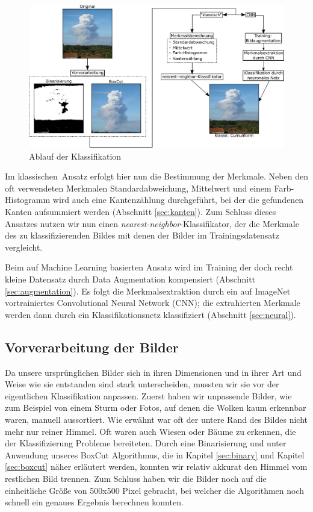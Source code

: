 \documentclass[a4,german]{article}
\begin{document}
\begin{figure}
	\centering
	\includegraphics[height=0.25\paperheight]{Ablauf.pdf}
	\caption{Ablauf der Klassifikation}
	\label{fig:ablauf}
\end{figure}

Im \glqq klassischen\grqq\ Ansatz erfolgt hier nun die Bestimmung der Merkmale.
Neben den oft verwendeten Merkmalen Standardabweichung, Mittelwert und einem Farb-Histogramm wird auch eine Kantenzählung durchgeführt, bei der die gefundenen Kanten aufsummiert werden (Abschnitt \ref{sec:kanten}).
Zum Schluss dieses Ansatzes nutzen wir nun einen \emph{nearest-neighbor}-Klassifikator, der die Merkmale des zu klassifizierenden Bildes mit denen der Bilder im Trainingsdatensatz vergleicht.

Beim auf Machine Learning basierten Ansatz wird im Training der doch recht kleine Datensatz durch Data Augmentation kompensiert (Abschnitt \ref{sec:augmentation}).
Es folgt die Merkmalsextraktion durch ein auf ImageNet vortrainiertes Convolutional Neural Network (CNN); die extrahierten Merkmale werden dann durch ein Klassifikationsnetz klassifiziert (Abschnitt \ref{sec:neural}).


\subsection{Vorverarbeitung der Bilder}
\label{sec:vorverarbeitung}
Da unsere ursprünglichen Bilder sich in ihren Dimensionen und in ihrer Art und Weise wie sie entstanden sind stark unterscheiden, mussten wir sie vor der eigentlichen Klassifikation anpassen.
Zuerst haben wir unpassende Bilder, wie zum Beispiel von einem Sturm oder Fotos, auf denen die Wolken kaum erkennbar waren, manuell aussortiert.
Wie erwähnt war oft der untere Rand des Bildes nicht mehr nur reiner Himmel. Oft waren auch Wiesen oder Bäume zu erkennen, die der Klassifizierung Probleme bereiteten.
Durch eine Binarisierung und unter Anwendung unseres BoxCut Algorithmus, die in Kapitel \ref{sec:binary} und Kapitel \ref{sec:boxcut} näher erläutert werden, konnten wir relativ akkurat den Himmel vom restlichen Bild trennen.
Zum Schluss haben wir die Bilder noch auf die einheitliche Größe von 500x500 Pixel gebracht, bei welcher die Algorithmen noch schnell ein genaues Ergebnis berechnen konnten.
\end{document}
